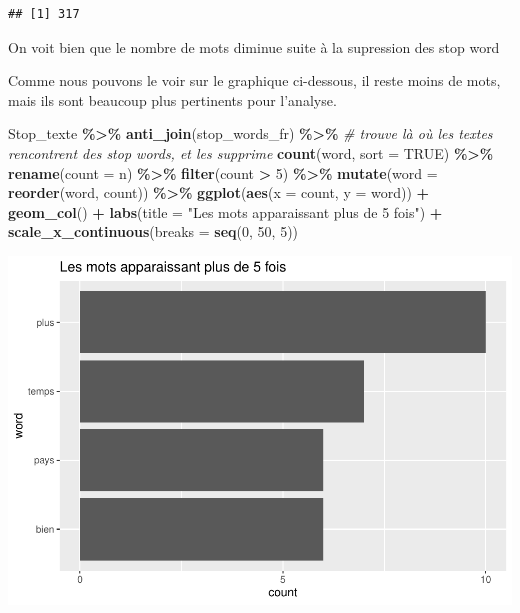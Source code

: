 \documentclass[
]{article}
\newenvironment{Shaded}{\begin{snugshade}}{\end{snugshade}}
\newcommand{\AttributeTok}[1]{\textcolor[rgb]{0.13,0.29,0.53}{#1}}
\newcommand{\CommentTok}[1]{\textcolor[rgb]{0.56,0.35,0.01}{\textit{#1}}}
\newcommand{\ConstantTok}[1]{\textcolor[rgb]{0.56,0.35,0.01}{#1}}
\newcommand{\DecValTok}[1]{\textcolor[rgb]{0.00,0.00,0.81}{#1}}
\newcommand{\FunctionTok}[1]{\textcolor[rgb]{0.13,0.29,0.53}{\textbf{#1}}}
\newcommand{\NormalTok}[1]{#1}
\newcommand{\SpecialCharTok}[1]{\textcolor[rgb]{0.81,0.36,0.00}{\textbf{#1}}}
\newcommand{\StringTok}[1]{\textcolor[rgb]{0.31,0.60,0.02}{#1}}
\begin{document}
\begin{verbatim}
## [1] 317
\end{verbatim}

On voit bien que le nombre de mots diminue suite à la supression des
stop word

Comme nous pouvons le voir sur le graphique ci-dessous, il reste moins
de mots, mais ils sont beaucoup plus pertinents pour l'analyse.

\begin{Shaded}
\begin{Highlighting}[]
\NormalTok{Stop\_texte }\SpecialCharTok{\%\textgreater{}\%}
  \FunctionTok{anti\_join}\NormalTok{(stop\_words\_fr) }\SpecialCharTok{\%\textgreater{}\%} \CommentTok{\# trouve là où les textes rencontrent des stop words, et les supprime}
  \FunctionTok{count}\NormalTok{(word, }\AttributeTok{sort =} \ConstantTok{TRUE}\NormalTok{) }\SpecialCharTok{\%\textgreater{}\%}
  \FunctionTok{rename}\NormalTok{(}\AttributeTok{count =}\NormalTok{ n) }\SpecialCharTok{\%\textgreater{}\%}
  \FunctionTok{filter}\NormalTok{(count }\SpecialCharTok{\textgreater{}} \DecValTok{5}\NormalTok{) }\SpecialCharTok{\%\textgreater{}\%}
  \FunctionTok{mutate}\NormalTok{(}\AttributeTok{word =} \FunctionTok{reorder}\NormalTok{(word, count)) }\SpecialCharTok{\%\textgreater{}\%}
  \FunctionTok{ggplot}\NormalTok{(}\FunctionTok{aes}\NormalTok{(}\AttributeTok{x =}\NormalTok{ count, }\AttributeTok{y =}\NormalTok{ word)) }\SpecialCharTok{+} 
  \FunctionTok{geom\_col}\NormalTok{() }\SpecialCharTok{+} 
  \FunctionTok{labs}\NormalTok{(}\AttributeTok{title =} \StringTok{"Les mots apparaissant plus de 5 fois"}\NormalTok{) }\SpecialCharTok{+} 
  \FunctionTok{scale\_x\_continuous}\NormalTok{(}\AttributeTok{breaks =} \FunctionTok{seq}\NormalTok{(}\DecValTok{0}\NormalTok{, }\DecValTok{50}\NormalTok{, }\DecValTok{5}\NormalTok{))}
\end{Highlighting}
\end{Shaded}

\includegraphics{Texte_mining_files/figure-latex/unnamed-chunk-9-1.pdf}
\end{document}
